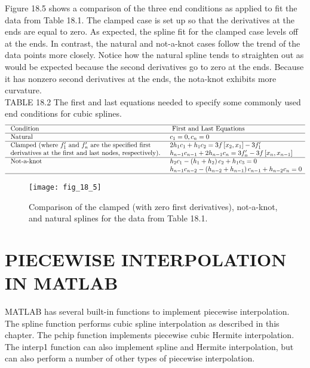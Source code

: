 \documentclass[../main.tex]{subfiles}
\begin{document}
Figure 18.5 shows a comparison of the three end conditions as applied to fit the data from
Table 18.1. The clamped case is set up so that the derivatives at the ends are equal to zero.
As expected, the spline fit for the clamped case levels off at the ends. In contrast, the
natural and not-a-knot cases follow the trend of the data points more closely. Notice how
the natural spline tends to straighten out as would be expected because the second derivatives go to zero at the ends. Because it has nonzero second derivatives at the ends, the nota-knot exhibits more curvature.
\vspace{2cm}\\
TABLE 18.2 The first and last equations needed to specify some commonly used end
    conditions for cubic splines.
$$
\begin{array}{ll}
    \hline \text { Condition } & \text { First and Last Equations } \\
    \hline \text { Natural } & c_{1}=0, c_{n}=0 \\
    \hline \text { Clamped (where } f_{1}^{\prime} \text { and } f_{n}^{\prime} \text { are the specified first } & 2 h_{1} c_{1}+h_{1} c_{2}=3 f\left[x_{2}, x_{1}\right]-3 f_{1}^{\prime} \\
    \text { derivatives at the first and last nodes, respectively). } & h_{n-1} c_{n-1}+2 h_{n-1} c_{n}=3 f_{n}^{\prime}-3 f\left[x_{n}, x_{n-1}\right] \\
    \hline \text { Not-a-knot } & h_{2} c_{1}-\left(h_{1}+h_{2}\right) c_{2}+h_{1} c_{3}=0 \\
    & h_{n-1} c_{n-2}-\left(h_{n-2}+h_{n-1}\right) c_{n-1}+h_{n-2} c_{n}=0 \\
    \hline
    \end{array}
$$
\begin{figure}[H]
    \centering
    \texttt{[image: fig\_18\_5]}
   \caption{\textsf{Comparison of the clamped (with zero first derivatives), not-a-knot, and natural splines for the
   data from Table 18.1.}}\label{fig:fig_18_5}
\end{figure}

\section{PIECEWISE INTERPOLATION IN MATLAB}
MATLAB has several built-in functions to implement piecewise interpolation. The spline
function performs cubic spline interpolation as described in this chapter. The pchip function implements piecewise cubic Hermite interpolation. The interp1 function can also
implement spline and Hermite interpolation, but can also perform a number of other types
of piecewise interpolation.
\end{document}
